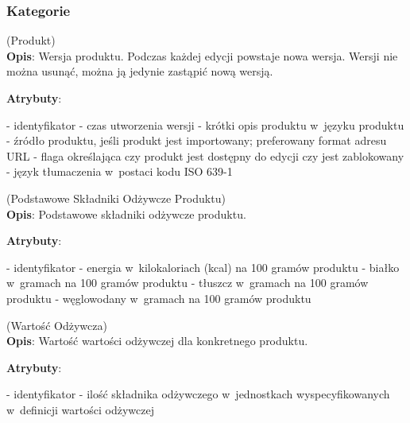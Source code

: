 \subsubsection{Kategorie}\label{subsubsec:database:products:categories}
\begin{enumerate}[label={\textbf{KAT/2/\protect\twodigits{\theenumi}}}, wide, labelwidth=!, labelindent=0pt, labelsep=0pt, series=reqs]
    \setlength\itemsep{1.75em}
    \label{kat:Product} (Produkt)\\
    \indent\textbf{Opis}: Wersja produktu. Podczas każdej edycji powstaje nowa wersja. Wersji nie można usunąć, można ją jedynie zastąpić nową wersją.
    \par
    \textbf{Atrybuty}:
    \begin{itemize}[series=atr, wide, align=left, leftmargin=190pt]
        \label{kat:Product:id}- identyfikator
        \label{kat:Product:createdDate}- czas utworzenia wersji
        \label{kat:Product:description}- krótki opis produktu w~języku produktu
        \label{kat:Product:source}- źródło produktu, jeśli produkt jest importowany; preferowany format adresu URL
        \label{kat:Product:isFinal}- flaga określająca czy produkt jest dostępny do edycji czy jest zablokowany
        \label{kat:Product:language}- język tłumaczenia w~postaci kodu ISO 639-1
    \end{itemize}

    \label{kat:ProductBasicNutritionData} (Podstawowe Składniki Odżywcze Produktu)\\
    \indent\textbf{Opis}: Podstawowe składniki odżywcze produktu.
    \par
    \textbf{Atrybuty}:
    \begin{itemize}[series=atr, wide, align=left, leftmargin=190pt]
        \label{kat:ProductBasicNutritionData:id}- identyfikator
        \label{kat:ProductBasicNutritionData:energy}- energia w~kilokaloriach (kcal) na 100 gramów produktu
        \label{kat:ProductBasicNutritionData:protein}- białko w~gramach na 100 gramów produktu
        \label{kat:ProductBasicNutritionData:fat}- tłuszcz w~gramach na 100 gramów produktu
        \label{kat:ProductBasicNutritionData:carbohydrates}- węglowodany w~gramach na 100 gramów produktu
    \end{itemize}

    \label{kat:NutritionData} (Wartość Odżywcza)\\
    \indent\textbf{Opis}: Wartość wartości odżywczej dla konkretnego produktu.
    \par
    \textbf{Atrybuty}:
    \begin{itemize}[series=atr, wide, align=left, leftmargin=190pt]
        \label{kat:NutritionData:id}- identyfikator
        \label{kat:NutritionData:nutritionValue}- ilość składnika odżywczego w~jednostkach wyspecyfikowanych w~definicji wartości odżywczej
    \end{itemize}


\end{enumerate}
